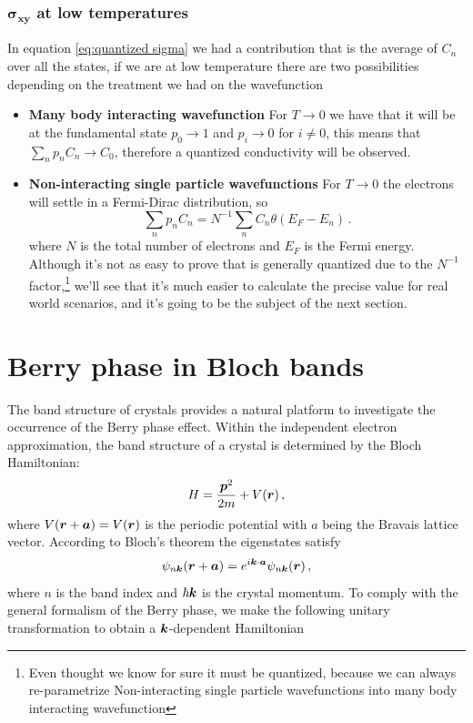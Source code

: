 \subsubsection*{$\boldsymbol{\sigma_{xy}}$ at low temperatures}
In equation \ref{eq:quantized sigma} we had a contribution that is the average of $C_n$ over all the states, if we are at low temperature there are two possibilities depending on the treatment we had on the wavefunction
\begin{itemize}
    \item \textbf{Many body interacting wavefunction} For $T\to 0$ we have that it will be at the fundamental state $p_0\to1$ and $p_i\to 0$ for $i\neq 0$, this means that $\sum_np_nC_n\to C_0$, therefore a quantized conductivity will be observed.
    \item \textbf{Non-interacting single particle wavefunctions} For $T\to 0$ the electrons will settle in a Fermi-Dirac distribution, so \[\sum_np_nC_n=N^{-1}\sum_nC_n\theta(E_F-E_n)\,.\] where $N$ is the total number of electrons and $E_F$ is the Fermi energy. Although it's not as easy to prove that is generally quantized due to the $N^{-1}$ factor,\footnote{Even thought we know for sure it must be quantized, because we can always re-parametrize Non-interacting single particle wavefunctions into many body interacting wavefunction} we'll see that it's much easier to calculate the precise value for real world scenarios, and it's going to be the subject of the next section.
\end{itemize}



















\section{Berry phase in Bloch bands}
\label{sec:berrybloch}
The band structure of crystals provides a natural platform to investigate the occurrence of the Berry phase effect. Within the independent electron approximation, the band structure of a crystal is determined by the Bloch Hamiltonian:
\begin{equation}
    H= \frac {\boldsymbol{p}^2}{2m} + V(\boldsymbol{r})\,,
\end{equation}
where $V(\boldsymbol{r}+\boldsymbol{a})=V(\boldsymbol{r})$ is the periodic potential with $a$ being the Bravais lattice vector. According to Bloch's theorem the eigenstates satisfy 
\begin{equation}
    \psi_{n\boldsymbol{k}}(\boldsymbol{r}+\boldsymbol{a})=e^{i\boldsymbol{k}\cdot \boldsymbol{a}}\psi_{n\boldsymbol{k}}(\boldsymbol{r})\,,
\end{equation}
where $n$ is the band index and $\hbar \boldsymbol{k}$ is the crystal momentum. To comply with the general formalism of the Berry phase, we make the following unitary transformation to obtain a $\boldsymbol{k}$-dependent Hamiltonian

